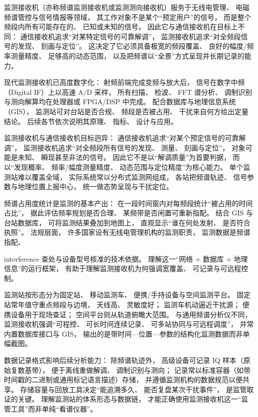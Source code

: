 监测接收机（亦称频谱监测接收机或监测测向接收机）服务于无线电管理、
电磁频谱管控与信号情报等领域，
其工作对象不是某个“预定用户”的信号，
而是整个频段内所有可能存在的、
已知或未知的信号。
因此它与通信接收机在目标上不同：
通信接收机追求“对某特定信号的可靠解调”，
监测接收机追求“对全频段信号的发现、
刻画与定位”。
这决定了它必须具备极宽的频段覆盖、
良好的幅度/频率测量精度、
足够高的动态范围，
以及把频谱以“全景”方式呈现并长期记录的能力。

现代监测接收机已高度数字化：
射频前端完成变频与放大后，
信号在数字中频（Digital IF）上以高速 A/D 采样，
所有扫描、
检波、
FFT 谱分析、
调制识别与测向解算均在处理器或 FPGA/DSP 中完成。
配合数据库与地理信息系统（GIS），
监测站可对台站是否合规、
频段是否被占用、
干扰来自何方给出定量结论。
后续各节依次说明其原理、
指标、
设计与应用。

监测接收机与通信接收机目标迥异：
通信接收机追求“对某个预定信号的可靠解调”，
监测接收机追求“对全频段所有信号的发现、
测量、
刻画与定位”，
对象可能是未知、
瞬现甚至非法的信号。
因此它不是以“解调质量”为首要判据，
而以“发现概率、
频率/幅度测量精度、
动态范围与定位精度”为核心能力。
单个监测站难以覆盖全域，
实际系统常以分布式监测网组成，
各站把频谱轨迹、
信号参数与地理位置上报中心，
统一做态势呈现与干扰定位。

频谱占用度统计是监测的基本产出：
在一段时间窗内对每频段统计“被占用的时间占比”，
据此评估频率规划是否合理、
某频带是否闲置可重新指配。
结合 GIS 与台站数据库，
可将监测结果叠加到地图上，
直观显示“谁在何处发射、
是否符合执照”。
法规层面，
许多国家设有无线电管理机构的监测职责，
监测数据是频谱指配、
 
interference 查处与设备型号核准的技术依据。
理解这一“网络 + 数据库 + 地理信息”的运行框架，
有助于理解监测接收机为何强调宽覆盖、
可记录与可远程控制。

监测站按形态分为固定站、
移动监测车、
便携/手持设备与空间监测平台。
固定站常年值守重点频段与边境，
天线高、
灵敏度好；
监测车机动逼近干扰源；
便携设备用于现场查证；
空间平台则从轨道俯瞰大范围。
与通用频谱分析仪不同，
监测接收机强调“可程控、
可长时间连续记录、
可多站协同与可远程调度”，
并常内置数据库接口与 GIS，
输出的是带时间—位置—参数的结构化监测数据而非单幅截图。

数据记录格式影响后续分析能力：
除频谱轨迹外，
高级设备可记录 IQ 样本（原始复数基带），
便于离线重做解调、
调制识别与测向；
记录常以标准容器（如带时间戳的二进制或通用标记语言描述）存储，
并遵循监测机构的数据规范以便共享。
存储容量与回放工具决定“能追溯多久、
能否复盘某次干扰事件”，
是监管取证的关键。
理解监测站的体系形态与数据链，
才能正确使用监测接收机这一“监管工具”而非单纯“看谱仪器”。


